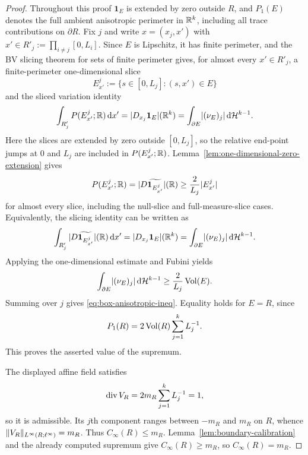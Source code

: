 \begin{proof}
Throughout this proof $\mathbf 1_E$ is extended by zero outside $R$, and
$P_1(E)$ denotes the full ambient anisotropic perimeter in $\mathbb{R}^k$, including
all trace contributions on $\partial R$.
Fix $j$ and write $x=(x_j,x')$ with
$x'\in R'_j:=\prod_{i\ne j}[0,L_i]$. Since $E$ is Lipschitz, it has finite
perimeter, and the BV slicing theorem for sets of finite perimeter
\cite[Sec.~5.10]{EvansGariepy2015} gives, for almost every $x'\in R'_j$, a
finite-perimeter one-dimensional slice
\[
E_{x'}^j:=\{s\in[0,L_j]:(s,x')\in E\}
\]
and the sliced variation identity
\begin{equation}
\label{eq:box-sliced-variation}
\int_{R'_j}P(E_{x'}^j;\mathbb{R})\,\mathrm{d} x'
=|D_{x_j}\mathbf 1_E|(\mathbb{R}^k)
=\int_{\partial E}\lvert (\nu_E)_j \rvert\,\mathrm{d}\mathcal{H}^{k-1}.
\end{equation}
Here the slices are extended by zero outside $[0,L_j]$, so the relative
end-point jumps at $0$ and $L_j$ are included in $P(E_{x'}^j;\mathbb{R})$.
Lemma~\ref{lem:one-dimensional-zero-extension} gives
\[
P(E_{x'}^j;\mathbb{R})=|D\widetilde{\mathbf 1_{E_{x'}^j}}|(\mathbb{R})
\ge \frac{2}{L_j}\lvert E_{x'}^j \rvert
\]
for almost every slice, including the null-slice and full-measure-slice cases.
Equivalently, the slicing identity can be written as
\[
\int_{R'_j}|D\widetilde{\mathbf 1_{E_{x'}^j}}|(\mathbb{R})\,\mathrm{d} x'
=|D_{x_j}\mathbf 1_E|(\mathbb{R}^k)
=\int_{\partial E}\lvert (\nu_E)_j \rvert\,\mathrm{d}\mathcal{H}^{k-1}.
\]
Applying the one-dimensional estimate and Fubini yields
\[
\int_{\partial E}\lvert (\nu_E)_j \rvert\,\mathrm{d}\mathcal{H}^{k-1}
\ge
\frac{2}{L_j}\operatorname{Vol}(E).
\]
Summing over $j$ gives \eqref{eq:box-anisotropic-ineq}. Equality holds for
$E=R$, since
\[
P_1(R)=2\operatorname{Vol}(R)\sum_{j=1}^k L_j^{-1}.
\]
This proves the asserted value of the supremum.

The displayed affine field satisfies
\[
\operatorname{div} V_R=
2m_R\sum_{j=1}^k L_j^{-1}=1,
\]
so it is admissible. Its $j$th component ranges between $-m_R$ and $m_R$ on
$R$, whence
$\lVert V_R \rVert_{L^\infty(R;\ell^\infty)}=m_R$. Thus $C_\infty(R)\le m_R$.
Lemma~\ref{lem:boundary-calibration} and the already computed supremum give
$C_\infty(R)\ge m_R$, so $C_\infty(R)=m_R$.
\end{proof}

